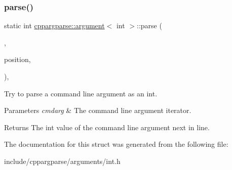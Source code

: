 \subsubsection{\texorpdfstring{parse()}{parse()}}
{\footnotesize\ttfamily static int \hyperlink{structcppargparse_1_1argument}{cppargparse\+::argument}$<$ int $>$\+::parse (\begin{DoxyParamCaption}\item[{const types\+::\+Command\+Line\+\_\+t \&}]{,  }\item[{const types\+::\+Command\+Line\+Position\+\_\+t \&}]{position,  }\item[{const types\+::\+Command\+Line\+Arguments\+\_\+t \&}]{ }\end{DoxyParamCaption})\hspace{0.3cm}{\ttfamily [inline]}, {\ttfamily [static]}}



Try to parse a command line argument as an int. 


\begin{DoxyParams}{Parameters}
{\em cmdarg} & The command line argument iterator.\\
\hline
\end{DoxyParams}
\begin{DoxyReturn}{Returns}
The int value of the command line argument next in line. 
\end{DoxyReturn}


The documentation for this struct was generated from the following file\+:\begin{DoxyCompactItemize}
\item 
include/cppargparse/arguments/int.\+h\end{DoxyCompactItemize}
